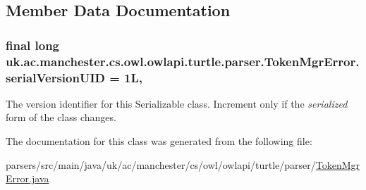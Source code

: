 \subsection{Member Data Documentation}
\hypertarget{classuk_1_1ac_1_1manchester_1_1cs_1_1owl_1_1owlapi_1_1turtle_1_1parser_1_1_token_mgr_error_a756cc980f7fdcac9dd0586bb2167b768}{
\subsubsection[{serial\-Version\-U\-I\-D}]{\setlength{\rightskip}{0pt plus 5cm}final long uk.\-ac.\-manchester.\-cs.\-owl.\-owlapi.\-turtle.\-parser.\-Token\-Mgr\-Error.\-serial\-Version\-U\-I\-D = 1\-L\hspace{0.3cm}{\ttfamily [static]}, {\ttfamily [private]}}}\label{classuk_1_1ac_1_1manchester_1_1cs_1_1owl_1_1owlapi_1_1turtle_1_1parser_1_1_token_mgr_error_a756cc980f7fdcac9dd0586bb2167b768}
The version identifier for this Serializable class. Increment only if the {\itshape serialized} form of the class changes. 

The documentation for this class was generated from the following file\-:\begin{DoxyCompactItemize}
\item 
parsers/src/main/java/uk/ac/manchester/cs/owl/owlapi/turtle/parser/\hyperlink{uk_2ac_2manchester_2cs_2owl_2owlapi_2turtle_2parser_2_token_mgr_error_8java}{Token\-Mgr\-Error.\-java}\end{DoxyCompactItemize}
